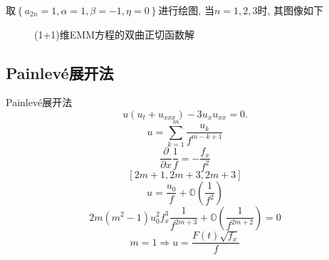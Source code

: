 \documentclass[handout]{beamer}
\newcommand{\mbrace}[1]{\left[#1\right]}
\newcommand{\bbrace}[1]{\left\{#1\right\}}
\newcommand{\OO}{\ensuremath{\mathbb O}}%
\newcommand{\DIF}[1]{\ensuremath{\frac{\partial}{\partial #1}}}
\newcommand{\Painleve}{Painlev{\'e}}
\begin{document}
\begin{frame}
取$\bbrace{a_{2n}=1,\alpha=1,\beta=-1,\eta=0}$进行绘图, 当$n=1,2,3$时, 其图像如下
\begin{figure}[ht]
\centering
{}
\caption{(1+1)维EMM方程的双曲正切函数解} 
\end{figure}
\end{frame}

\subsection{\Painleve{}展开法}
\begin{frame}{\Painleve{}展开法}
\[
  u(u_t+u_{xxx})-3u_x u_{xx}=0.
\]
\[
  u=\sum_{k=1}^{m}\frac{u_k}{f^{m-k+1}}
\]
\[
  \DIF{x}{\frac{1}{f}}=-\frac{f_x}{f^2}
\]
\[
  \mbrace{2m+1,2m+3,2m+3}
\]
\[
  u=\frac{u_0}{f}+\OO(\frac{1}{f^2})
\]
\[
  2m(m^2-1)u_0^2f_x^3\frac{1}{f^{2m+3}}+\OO(\frac{1}{f^{2m+2}})=0
\]
\[
  m=1\Rightarrow u=\frac{F(t)\sqrt{f_x}}{f}
\]
\end{frame}
\end{document}
